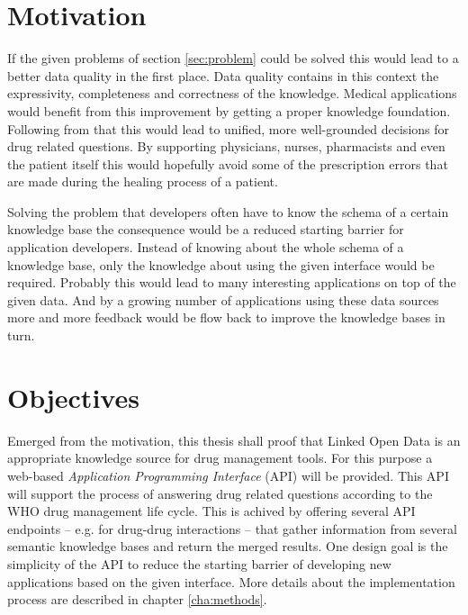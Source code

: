 \section{Motivation}
\label{sec:motivation}

If the given problems of section \ref{sec:problem} could be solved this would lead to a better data quality in the first place.
Data quality contains in this context the expressivity, completeness and correctness of the knowledge.
Medical applications would benefit from this improvement by getting a proper knowledge foundation.
Following from that this would lead to unified, more well-grounded decisions for drug related questions.
By supporting physicians, nurses, pharmacists and even the patient itself this would hopefully avoid some of the prescription errors that are made during the healing process of a patient.

Solving the problem that developers often have to know the schema of a certain knowledge base the consequence would be a reduced starting barrier for application developers.
Instead of knowing about the whole schema of a knowledge base, only the knowledge about using the given interface would be required.
Probably this would lead to many interesting applications on top of the given data.
And by a growing number of applications using these data sources more and more feedback would be flow back to improve the knowledge bases in turn.


\section{Objectives}
\label{sec:objectives}

Emerged from the motivation, this thesis shall proof that Linked Open Data is an appropriate knowledge source for drug management tools.
For this purpose a web-based \textit{Application Programming Interface} (API) will be provided.
This API will support the process of answering drug related questions according to the WHO drug management life cycle.
This is achived by offering several API endpoints -- e.g. for drug-drug interactions -- that gather information from several semantic knowledge bases and return the merged results.
One design goal is the simplicity of the API to reduce the starting barrier of developing new applications based on the given interface.
More details about the implementation process are described in chapter \ref{cha:methods}.

